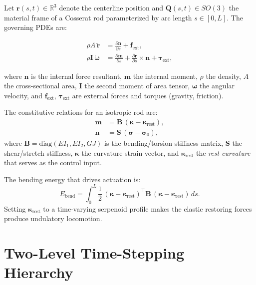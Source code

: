 \documentclass[11pt]{article}
\newcommand{\vect}[1]{\mathbf{#1}}
\newcommand{\mat}[1]{\mathbf{#1}}
\newcommand{\Real}{\mathbb{R}}
\newcommand{\dds}[1]{\frac{\partial #1}{\partial s}}
\newcommand{\krest}{\bm{\kappa}_{\mathrm{rest}}}
\begin{document}
Let $\vect{r}(s,t) \in \Real^3$ denote the centerline position and
$\mat{Q}(s,t) \in SO(3)$ the material frame of a Cosserat rod parameterized
by arc length $s \in [0, L]$.  The governing PDEs are:

\begin{align}
  \rho A \, \ddot{\vect{r}}
    &= \dds{\vect{n}} + \vect{f}_{\mathrm{ext}},
    \label{eq:linear-momentum} \\[4pt]
  \rho \vect{I} \, \dot{\bm{\omega}}
    &= \dds{\vect{m}} + \dds{\vect{r}} \times \vect{n}
       + \bm{\tau}_{\mathrm{ext}},
    \label{eq:angular-momentum}
\end{align}

\noindent where $\vect{n}$ is the internal force resultant, $\vect{m}$ the
internal moment, $\rho$ the density, $A$ the cross-sectional area,
$\vect{I}$ the second moment of area tensor, $\bm{\omega}$ the angular
velocity, and $\vect{f}_{\mathrm{ext}}$, $\bm{\tau}_{\mathrm{ext}}$ are
external forces and torques (gravity, friction).

The constitutive relations for an isotropic rod are:
\begin{align}
  \vect{m} &= \mat{B}\,(\bm{\kappa} - \krest), \label{eq:bending} \\
  \vect{n} &= \mat{S}\,(\bm{\sigma} - \bm{\sigma}_0), \label{eq:shearing}
\end{align}
where $\mat{B} = \mathrm{diag}(EI_1, EI_2, GJ)$ is the bending/torsion
stiffness matrix, $\mat{S}$ the shear/stretch stiffness, $\bm{\kappa}$ the
curvature strain vector, and $\krest$ the \emph{rest curvature} that serves
as the control input.

The bending energy that drives actuation is:
\begin{equation}
  E_{\mathrm{bend}} = \int_0^L \frac{1}{2}\,
    (\bm{\kappa} - \krest)^\top \mat{B}\, (\bm{\kappa} - \krest) \, ds.
  \label{eq:bending-energy}
\end{equation}
Setting $\krest$ to a time-varying serpenoid profile makes the elastic
restoring forces produce undulatory locomotion.

\section{Two-Level Time-Stepping Hierarchy}
\label{sec:hierarchy}
\end{document}
